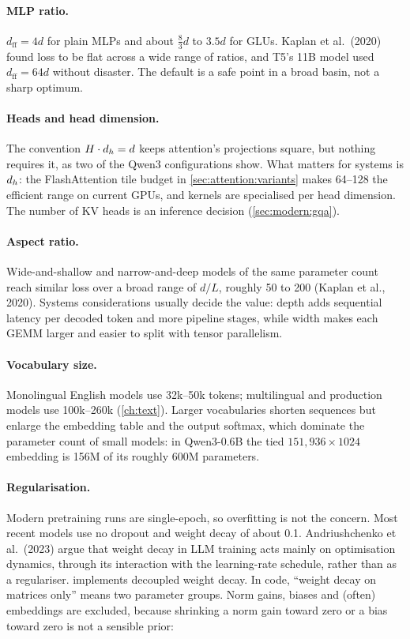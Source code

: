 \paragraph{MLP ratio.} $d_\text{ff}=4d$ for plain MLPs and about $\frac83 d$ to $3.5d$ for GLUs. Kaplan et
al.~(2020) found loss to be flat across a wide range of ratios, and T5's 11B model used $d_\text{ff}=64d$
without disaster. The default is a safe point in a broad basin, not a sharp optimum.

\paragraph{Heads and head dimension.} The convention $H\cdot d_{h}=d$ keeps attention's projections square,
but nothing requires it, as two of the Qwen3 configurations show. What matters for systems is
$d_{h}$: the FlashAttention tile budget in \cref{sec:attention:variants} makes 64--128 the efficient range
on current GPUs, and kernels are specialised per head dimension. The number of KV heads is an
inference decision (\cref{sec:modern:gqa}).

\paragraph{Aspect ratio.} Wide-and-shallow and narrow-and-deep models of the same parameter count reach
similar loss over a broad range of $d/L$, roughly 50 to 200 (Kaplan et al., 2020). Systems
considerations usually decide the value: depth adds sequential latency per decoded token and more pipeline
stages, while width makes each GEMM larger and easier to split with tensor parallelism.

\paragraph{Vocabulary size.} Monolingual English models use 32k--50k tokens; multilingual and production
models use 100k--260k (\cref{ch:text}). Larger vocabularies shorten sequences but enlarge the embedding
table and the output softmax, which dominate the parameter count of small models: in Qwen3-0.6B the tied
$151{,}936\times1024$ embedding is 156M of its roughly 600M parameters.

\paragraph{Regularisation.} Modern pretraining runs are single-epoch, so overfitting is not the concern.
Most recent models use no dropout and weight decay of about 0.1. Andriushchenko et al.~(2023) argue that
weight decay in LLM training acts mainly on optimisation dynamics, through its interaction with the
learning-rate schedule, rather than as a regulariser.  implements decoupled weight decay.
In code, ``weight decay on matrices only'' means two parameter groups. Norm gains, biases and (often)
embeddings are excluded, because shrinking a norm gain toward zero or a bias toward zero is not a sensible prior:

